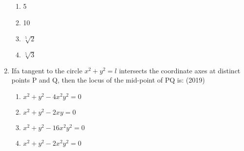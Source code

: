 \documentclass[12pt]{article}
\begin{document}
\begin{enumerate}
\begin{enumerate}
\item 5
\item 10
\item $\sqrt[5]{2}$
\item $\sqrt[5]{3}$
\end{enumerate}
\item  Ifa tangent to the circle $x^2+y^2=l$ intersects the coordinate axes at distinct points P and Q, then the locus of the mid-point of PQ is: (2019)
\begin{enumerate}
\item $x^2+y^2-4x^2y^2=0$
\item $x^2+y^2-2xy=0$
\item $x^2+y^2-16x^2y^2=0$
\item $x^2+y^2-2x^2y^2=0$
\end{enumerate}
\end{enumerate}
\end{document}
